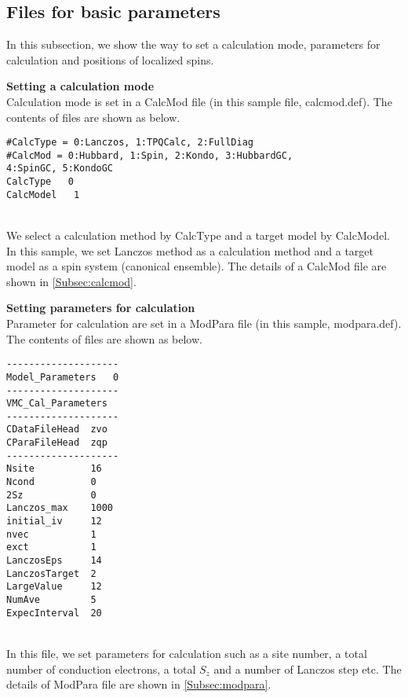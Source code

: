 \subsection{Files for basic parameters}
In this subsection, we show the way to set a calculation mode, parameters for calculation and positions of localized spins.
\begin{description}
\item {\bf Setting a calculation mode}\\
Calculation mode is set in a CalcMod file (in this sample file, calcmod.def). The contents of files are shown as below.\\
\begin{minipage}{15cm}
\begin{screen}
\begin{verbatim}
#CalcType = 0:Lanczos, 1:TPQCalc, 2:FullDiag
#CalcMod = 0:Hubbard, 1:Spin, 2:Kondo, 3:HubbardGC, 
4:SpinGC, 5:KondoGC 
CalcType   0
CalcModel   1
\end{verbatim}
\end{screen}
\end{minipage}
~\\
We select a calculation method by CalcType and a target model by CalcModel. In this sample, we set Lanczos method as a calculation method and a target model as a spin system (canonical ensemble). The details of a CalcMod file are shown in \ref{Subsec:calcmod}.\\

\item {\bf Setting parameters for calculation}\\
Parameter for calculation are set in a ModPara file (in this sample, modpara.def). The contents of files are shown as below.\\
\begin{minipage}{15cm}
\begin{screen}
\begin{verbatim}
--------------------
Model_Parameters   0
--------------------
VMC_Cal_Parameters
--------------------
CDataFileHead  zvo
CParaFileHead  zqp
--------------------
Nsite          16   
Ncond          0    
2Sz            0    
Lanczos_max    1000 
initial_iv     12   
nvec           1    
exct           1    
LanczosEps     14   
LanczosTarget  2    
LargeValue     12   
NumAve         5    
ExpecInterval  20 
\end{verbatim}
\end{screen}
\end{minipage}
~\\
In this file, we set parameters for calculation such as a site number, {a total number of conduction electrons,  a total $S_z$} and a number of Lanczos step etc. The details of ModPara file are shown in \ref{Subsec:modpara}.\\


\end{description}
